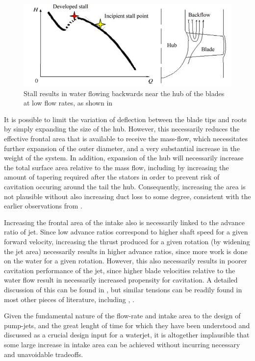 \documentclass{article}\usepackage[]{graphicx}\usepackage[]{color}
\begin{document}
\begin{figure}
\includegraphics[width=\textwidth]{backflow.png}
\caption{Stall results in water flowing backwards near the hub of the blades at low flow rates, as shown in \cite{li2014rotating}}
\label{fig:backflow.png}
\end{figure}

It is possible to limit the variation of deflection between the blade tips and roots by simply expanding the size of the hub.  However, this necessarily reduces the effective frontal area that is available to receive the mass-flow, which necessitates further expansion of the outer diameter, and a very substantial increase in the weight of the system.  In addition, expansion of the hub will necessarily increase the total surface area relative to the mass flow, including by increasing the amount of tapering required after the stators in order to prevent risk of cavitation occuring around the tail the hub.  Consequently, increasing the area is not plausible without also increasing duct loss to some degree, consistent with the earlier observations from \cite{henderson1964}.

Increasing the frontal area of the intake also is necessarily linked to the advance ratio of jet.  Since low advance ratios correspond to higher shaft speed for a given forward velocity, increasing the thrust produced for a given rotation (by widening the jet area) necessarily results in higher advance ratios, since more work is done on the water for a given rotation. However, this also necessarily results in poorer cavitation performance of the jet, since higher blade velocities relative to the water flow result in necessarily increased propensity for cavitation.  A detailed discussion of this can be found in \cite{gearhart1966selection}, but similar tensions can be readily found in most other pieces of literature, including \cite{henderson1964}, \cite{wislicenus1973}.

Given the fundamental nature of the flow-rate and intake area to the design of pump-jets, and the great lenght of time for which they have been understood and discussed as a crucial design input for a waterjet, it is altogether implausible that some large increase in intake area can be achieved without incurring necessary and unavoidable tradeoffs.
\end{document}
